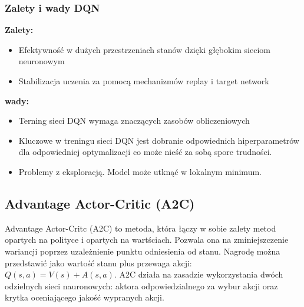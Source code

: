 \documentclass[a4paper, 10pt]{article}
\begin{document}
    \subsubsection{Zalety i wady DQN}
    \noindent \textbf{Zalety:}
    \begin{itemize}
        \item Efektywność w dużych przestrzeniach stanów dzięki głębokim sieciom neuronowym
        \item Stabilizacja uczenia za pomocą mechanizmów replay i target network
    \end{itemize}
    \textbf{wady:}
    \begin{itemize}
        \item Terning sieci DQN wymaga znaczących zasobów obliczeniowych
        \item Kluczowe w treningu sieci DQN jest dobranie odpowiednich hiperparametrów dla odpowiedniej optymalizacji
        co może nieść za sobą spore trudności.
        \item Problemy z eksploracją. Model może utknąć w lokalnym minimum.
    \end{itemize}
    \subsection{Advantage Actor-Critic (A2C)}
    Advantage Actor-Critc (A2C) to metoda, która łączy w sobie zalety metod opartych na polityce i opartych na wartściach.
    Pozwala ona na zminiejszczenie wariancji poprzez uzależnienie punktu odniesienia od stanu. Nagrodę można przedstawić
    jako wartość stanu plus przewaga akcji: \( Q(s,a) = V(s) + A(s,a) \). A2C działa na zasadzie wykorzystania dwóch odzielnych
    sieci nauronowych: aktora odpowiedzialnego za wybur akcji oraz krytka oceniającego jakość wypranych akcji.
\end{document}

